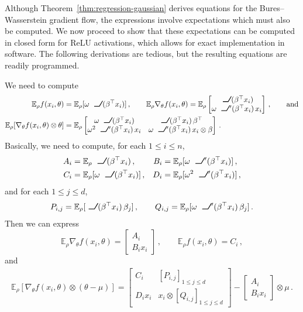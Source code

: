 \documentclass{custom}
\begin{document}
Although Theorem~\ref{thm:regression-gaussian} derives equations for the Bures--Wasserstein gradient flow, the expressions involve expectations which must also be computed.
We now proceed to show that these expectations can be computed in closed form for ReLU activations, which allows for exact implementation in software.
The following derivations are tedious, but the resulting equations are readily programmed.

We need to compute 
\begin{align*}
\mathbb{E}_{\rho} f(x_{i},\theta) & =\mathbb{E}_{\rho}[\omega\ReLU(\beta^\top x_{i})]\,,\qquad\mathbb{E}_{\rho} \nabla_{\theta}f(x_{i},\theta)=\mathbb{E}_{\rho}\begin{bmatrix}
\ReLU(\beta^\top x_{i})\\
\omega\ReLU'(\beta^\top x_{i})\,x_{i}
\end{bmatrix}\,,\qquad\text{and}\\
\mathbb{E}_{\rho}[\nabla_{\theta}f(x_{i},\theta)\otimes\theta] & =\mathbb{E}_{\rho}\begin{bmatrix}
\omega \ReLU(\beta^\top x_{i}) & \ReLU(\beta^\top x_{i})\,\beta^{\top}\\
\omega^{2}\ReLU'(\beta^\top x_{i})\,x_{i} & \omega\ReLU'(\beta^\top x_{i})\,x_{i}\otimes\beta
\end{bmatrix}\,.
\end{align*}
Basically, we need to compute, for each $1\leq i\leq n$,
\begin{align*}
    A_{i}&=\mathbb{E}_{\rho} \ReLU(\beta^\top x_{i})\,, &B_{i}&=\mathbb{E}_{\rho}[\omega\ReLU'(\beta^\top x_{i})]\,, \\ C_{i}&=\mathbb{E}_{\rho}[\omega \ReLU(\beta^\top x_{i})]\,, &D_{i}&=\mathbb{E}_{\rho}[\omega^{2}\ReLU'(\beta^\top x_{i})]\,,
\end{align*}
and for each $1\leq j\leq d$, 
\[
P_{i,j}=\mathbb{E}_{\rho}[\ReLU(\beta^\top x_i)\,\beta_{j}]\,,\qquad Q_{i,j}=\mathbb{E}_{\rho}[\omega\ReLU'(\beta^\top x_i)\,\beta_{j}]\,.
\]
Then we can express 
\[
\mathbb{E}_{\rho} \nabla_{\theta}f(x_{i},\theta)=\begin{bmatrix}
A_{i}\\
B_{i}x_{i}
\end{bmatrix}\,,\qquad\mathbb{E}_{\rho} f(x_{i},\theta)=C_{i}\,, \]
and
\begin{align*}
\mathbb{E}_{\rho}[\nabla_{\theta}f(x_{i},\theta)\otimes(\theta-\mu)]=\begin{bmatrix}
C_{i} & [P_{i,j}]_{1\leq j\leq d}\\[0.25em]
D_{i}x_{i} & x_{i}\otimes[Q_{i,j}]_{1\leq j\leq d}
\end{bmatrix}-\begin{bmatrix}
A_{i}\\
B_{i}x_{i}
\end{bmatrix}\otimes\mu\,.
\end{align*}
\end{document}
